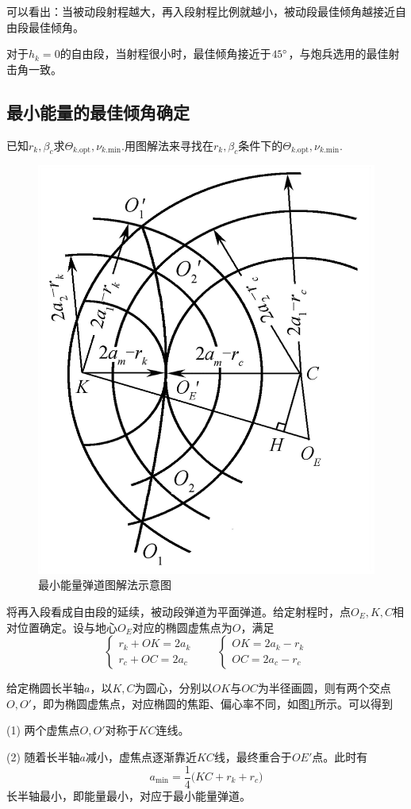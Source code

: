 可以看出：当被动段射程越大，再入段射程比例就越小，被动段最佳倾角越接近自由段最佳倾角。

对于$h_k = 0$的自由段，当射程很小时，最佳倾角接近于$45 {}^{\circ}$，与炮兵选用的最佳射击角一致。


\subsection{最小能量的最佳倾角确定}

已知$r_k, \beta_c$求$\varTheta_{k\text{.opt}}, \nu_{k\text{.min}}$.用图解法来寻找在$r_k, \beta_c$条件下的$\varTheta_{k\text{.opt}}, \nu_{k\text{.min}}$.
\begin{figure}[!htb]
	\centering
	\includegraphics[width=0.3\linewidth]{pic/最小能量-最佳倾角.jpg}
	\vspace*{-1em}
	\caption{最小能量弹道图解法示意图}
	\label{最小能量}
\end{figure}

将再入段看成自由段的延续，被动段弹道为平面弹道。给定射程时，点$O_E, K, C$相对位置确定。设与地心$O_E$对应的椭圆虚焦点为$O$，满足
\begin{equation}
	\begin{cases}
		r_k + OK = 2a_k \\
		r_c + OC = 2a_c
	\end{cases} \qquad 
	\begin{cases}
		OK = 2a_k - r_k \\
		OC = 2a_c - r_c
	\end{cases}
\end{equation}

给定椭圆长半轴$a$，以$K,C$为圆心，分别以$OK$与$OC$为半径画圆，则有两个交点$O,O'$，即为椭圆虚焦点，对应椭圆的焦距、偏心率不同，如图\ref{最小能量}所示。可以得到

(1) \hspace*{0.5em} 两个虚焦点$O,O'$对称于$KC$连线。

(2) \hspace*{0.5em} 随着长半轴$a$减小，虚焦点逐渐靠近$KC$线，最终重合于$OE'$点。此时有
\begin{equation}
	a_{\min} = \dfrac{1}{4} \big(KC + r_k + r_c\big)
\end{equation}
长半轴最小，即能量最小，对应于最小能量弹道。
















